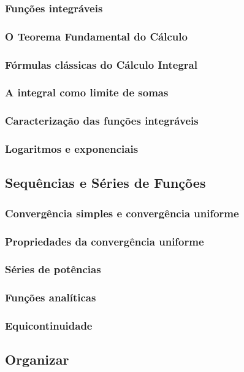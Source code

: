 \documentclass{article}
\theoremstyle{plain}
\theoremstyle{definition}
\theoremstyle{remark}
\begin{document}
   \subsubsection{ Funções integráveis}
   \subsubsection{ O Teorema Fundamental do Cálculo}
   \subsubsection{ Fórmulas clássicas do Cálculo Integral}
   \subsubsection{ A integral como limite de somas}
   \subsubsection{ Caracterização das funções integráveis}
   \subsubsection{ Logaritmos e exponenciais}
\subsection{ Sequências e Séries de Funções}
   \subsubsection{ Convergência simples e convergência uniforme}
   \subsubsection{ Propriedades da convergência uniforme}
   \subsubsection{ Séries de potências}
   \subsubsection{ Funções analíticas}
   \subsubsection{ Equicontinuidade}
\subsection{Organizar}
\end{document}
